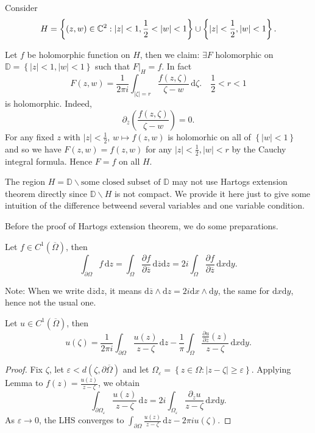 \begin{example}
  Consider 
  \[
    H=\left\{(z,w)\in \C^2:|z|<1, \frac{1}{2}<|w|<1\right\}\cup \left\{|z|<\frac{1}{2},|w|<1\right\}.  
  \]

\begin{figure}[ht]
    \centering
    \caption{}
    \label{fig:fig1}
\end{figure}
Let $f$ be holomorphic function on $H$, then we claim: $\exists F$ holomorphic  on $\mathbb{D}=\left\{|z|<1,|w|<1\right\} $ such that $F|_{H}=f$.
In fact 
\[
  F(z,w)=\frac{1}{2\pi i }\int_{|\zeta|=r} \frac{f(z,\zeta)}{\zeta-w}\,\mathrm{d}\zeta.\quad  \frac{1}{2}<r<1
\] 
is holomorphic. Indeed, 
\[
  \partial_{\overline{z}}\left( \frac{f(z,\zeta)}{\zeta-w} \right) =0. 
\] 
For any fixed $z$ with $|z|<\frac{1}{2}$, $w\mapsto f(z,w)$ is holomorhic on all of $\left\{|w|<1\right\} $ and so we have $F(z,w)=f(z,w)$ for any $|z|<\frac{1}{2},|w|<r$ by the Cauchy integral formula. Hence $F=f$ on all $H$.

The region $H=\mathbb{D}\backslash \text{some closed subset of }\mathbb{D}$ may not use Hartogs extension theorem directly since $\mathbb{D}\backslash H$ is not compact. We provide it here just to give some intuition of the difference betweend several variables and one variable condition.
\end{example}
Before the proof of Hartogs extension theorem, we do some preparations.
\begin{lemma}
  Let $f\in C^1(\overline{\Omega})$, then 
  \[
  \int_{\partial \Omega}f\,\mathrm{d}z=\int_{\Omega}\frac{\partial f}{\partial \overline{z}} \,\mathrm{d}\overline{z}\mathrm{d}z=2 i \int_{\Omega}\frac{\partial f}{\partial \overline{z}} \,\mathrm{d}x\mathrm{d}y.
  \] 
\end{lemma}
Note: When we write $\mathrm{d}\overline{z}\mathrm{d}z$, it means $\mathrm{d}\overline{z}\wedge \mathrm{d}z=2 i \mathrm{d}x\wedge \mathrm{d}y$, the same for $\mathrm{d}x\mathrm{d}y$, hence not the usual one.
\begin{proposition}
  Let $u\in C^{1}(\overline{\Omega})$, then 
  \[
    u(\zeta)=\frac{1}{2\pi i}\int_{\partial \Omega} \frac{u(z)}{z-\zeta}\,\mathrm{d}z-\frac{1}{\pi}\int_{\Omega}\frac{\frac{\partial u}{\partial \overline{z}} (z)}{z-\zeta}\,\mathrm{d}x\mathrm{d}y.
  \] 
\end{proposition}
\begin{proof}
  Fix $\zeta$, let $\varepsilon <d\left( \zeta,\partial \overline{\Omega} \right) $ and let $\Omega_\varepsilon =\left\{z\in  \Omega:|z-\zeta|\ge\varepsilon \right\} $. Applying Lemma to $f(z)=\frac{u(z)}{z-\zeta}$, we obtain
  \[
    \int_{\partial \Omega_\varepsilon } \frac{u(z)}{z-\zeta}\,\mathrm{d}z=2i \int_{\Omega_\varepsilon }\frac{\partial_{\overline{z}}u}{z-\zeta}\,\mathrm{d}x\mathrm{d}y.
  \] 
  As $\varepsilon \to 0$, the LHS converges to $\int_{\partial \Omega} \frac{u(z)}{z-\zeta}\,\mathrm{d}z-2\pi i u(\zeta)$.
\end{proof}
